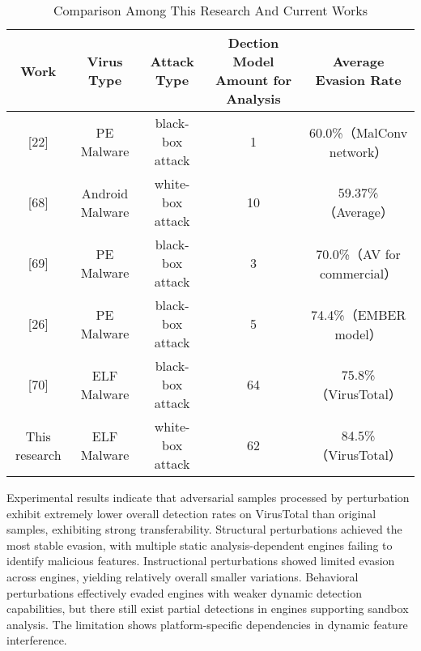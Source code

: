 %
%
%
%

\begin{conclusion}

\begin{table}[htbp]
	\centering
	\caption{Comparison Among This Research And Current Works}
	\label{tab:5.14}
	\begin{tabular*}{\textwidth}{@{\extracolsep{\fill}}ccccc}
		\toprule
		Work & Virus Type & Attack Type & Dection Model Amount for Analysis & Average Evasion Rate \\
		\midrule
		{[22]} & PE Malware & black-box attack & 1 & 60.0\%（MalConv network） \\
		{[68]} & Android Malware & white-box attack & 10 & 59.37\%（Average） \\
		{[69]} & PE Malware & black-box attack & 3 & 70.0\%（AV for commercial） \\
		{[26]} & PE Malware & black-box attack & 5 & 74.4\%（EMBER model） \\
		{[70]} & ELF Malware & black-box attack & 64 & 75.8\%（VirusTotal） \\
		This research & ELF Malware & white-box attack & 62 & 84.5\%（VirusTotal） \\
		\bottomrule
	\end{tabular*}
\end{table}

Experimental results indicate that adversarial samples processed by perturbation exhibit extremely lower overall detection rates on VirusTotal than original samples, exhibiting strong transferability. Structural perturbations achieved the most stable evasion, with multiple static analysis-dependent engines failing to identify malicious features. Instructional perturbations showed limited evasion across engines, yielding relatively overall smaller variations. Behavioral perturbations effectively evaded engines with weaker dynamic detection capabilities, but there still exist partial detections in engines supporting sandbox analysis. The limitation shows platform-specific dependencies in dynamic feature interference.


\end{conclusion}
